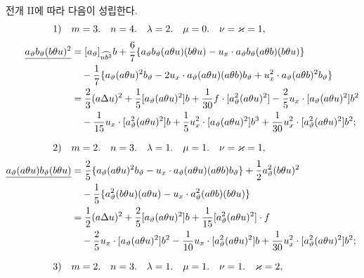 전개 II에 따라 다음이 성립한다.
\[
\begin{aligned}
\text{1)}\quad&m=3.\quad n=4.\quad \lambda=2.\quad \mu=0.\quad \nu=\varkappa=1,\\[0.25em]
\underline{a_\vartheta b_\vartheta(b\theta u)^2}
&=[a_\vartheta]_{\widehat{ub^2}}b+\frac67\{a_\vartheta b_\vartheta(a\theta u)(b\theta u)-u_x\cdot a_\vartheta b_\vartheta(a\theta b)(b\theta u)\}\\
&\quad-\frac17\{a_\vartheta(a\theta u)^2b_\vartheta-2u_x\cdot a_\vartheta(a\theta u)(a\theta b)b_\vartheta+u_x^2\cdot a_\vartheta(a\theta b)^2b_\vartheta\}\\
&=\frac23(a\Delta u)^2+\frac15[a_\vartheta(a\theta u)^2]b+\frac1{30}f\cdot[a_\vartheta^2(a\theta u)^2]-\frac25u_x\cdot[a_\vartheta(a\theta u)^2]b^2\\
&\quad-\frac1{15}u_x\cdot[a_\vartheta^2(a\theta u)^2]b+\frac15u_x^2\cdot[a_\vartheta(a\theta u)^2]b^3+\frac1{30}u_x^2\cdot[a_\vartheta^2(a\theta u)^2]b^2;\\[0.7em]
\text{2)}\quad&m=2.\quad n=3.\quad \lambda=1.\quad \mu=1.\quad \nu=\varkappa=1,\\[0.25em]
\underline{a_\vartheta(a\theta u)b_\vartheta(b\theta u)}
&=\frac25\{a_\vartheta(a\theta u)^2b_\vartheta-u_x\cdot a_\vartheta(a\theta u)(a\theta b)b_\vartheta\}+\frac12a_\vartheta^2(b\theta u)^2\\
&\quad-\frac15\{a_\vartheta^2(b\theta u)(a\theta u)-u_x\cdot a_\vartheta^2(a\theta b)(b\theta u)\}\\
&=\frac12(a\Delta u)^2+\frac25[a_\vartheta(a\theta u)^2]b+\frac1{15}[a_\vartheta^2(a\theta u)^2]\cdot f\\
&\quad-\frac25u_x\cdot[a_\vartheta(a\theta u)^2]b^2-\frac1{10}u_x\cdot[a_\vartheta^2(a\theta u)^2]b+\frac1{30}u_x^2\cdot[a_\vartheta^2(a\theta u)^2]b^2;\\[0.7em]
\text{3)}\quad&m=2.\quad n=3.\quad \lambda=1.\quad \mu=1.\quad \nu=1.\quad \varkappa=2,
\end{aligned}
\]

